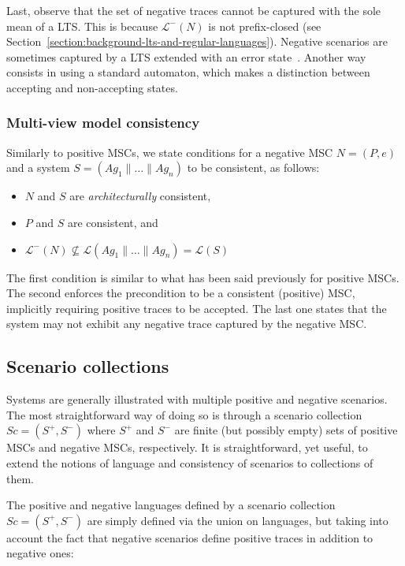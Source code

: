 Last, observe that the set of negative traces cannot be captured with the sole mean of a LTS. This is because $\mathcal{L}^{-}(N)$ is not prefix-closed (see Section~\ref{section:background-lts-and-regular-languages}). Negative scenarios are sometimes captured by a LTS extended with an error state~\cite{Uchitel:2004}. Another way consists in using a standard automaton, which makes a distinction between accepting and non-accepting states. 

\subsubsection*{Multi-view model consistency}

Similarly to positive MSCs, we state conditions for a negative MSC $N = (P,e)$ and a system $S = (Ag_1 \parallel \ldots \parallel Ag_n)$ to be consistent, as follows:

\begin{itemize}
\item $N$ and $S$ are \emph{architecturally} consistent,
\item $P$ and $S$ are consistent, and
\item $\mathcal{L}^{-}(N) \not\subseteq \mathcal{L}(Ag_1 \parallel \ldots \parallel Ag_n) = \mathcal{L}(S)$
\end{itemize}

The first condition is similar to what has been said previously for positive MSCs. The second enforces the precondition to be a consistent (positive) MSC, implicitly requiring positive traces to be accepted. The last one states that the system may not exhibit any negative trace captured by the negative MSC.

\subsection{Scenario collections}

Systems are generally illustrated with multiple positive and negative scenarios. The most straightforward way of doing so is through a scenario collection $Sc = (S^+,S^-)$ where $S^+$ and $S^-$ are finite (but possibly empty) sets of positive MSCs and negative MSCs, respectively. It is straightforward, yet useful, to extend the notions of language and consistency of scenarios to collections of them. 

The positive and negative languages defined by a scenario collection $Sc = (S^+,S^-)$ are simply defined via the union on languages, but taking into account the fact that negative scenarios define positive traces in addition to negative ones:

